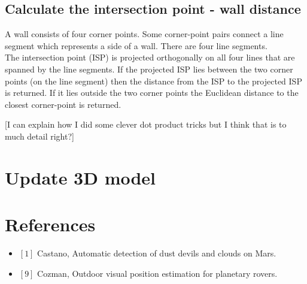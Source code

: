 \documentclass[10pt]{article}
\begin{document}
\subsection{Calculate the intersection point - wall distance}
A wall consists of four corner points. Some corner-point pairs connect a line segment which represents a side of a wall. There are four line segments.\\
The intersection point (ISP) is projected orthogonally on all four lines that
are spanned by the line segments.  If the projected ISP lies between the two
corner points (on the line segment) then the distance from the ISP to the
projected ISP is returned.  If it lies outside the two corner points the
Euclidean distance to the closest corner-point is returned.

[I can explain how I did some clever dot product tricks but I think that is to much detail right?]


\section{Update 3D model}


\section{References}
\begin{itemize}
\item $[1]$ Castano, Automatic detection of dust devils and clouds on Mars.
\item $[9]$ Cozman, Outdoor visual position estimation for planetary rovers.
\end{itemize}
\end{document}
